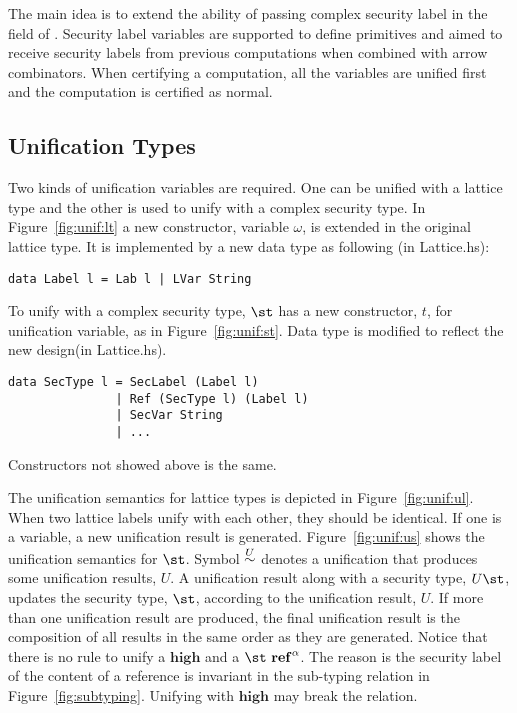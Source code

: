The main idea is to extend the ability of passing complex security label in the  field 
of . Security label variables are supported to define primitives and aimed to
receive security labels from previous computations when combined with arrow combinators.
When certifying a computation, all the variables are unified first and the computation is 
certified as normal.

\subsection{Unification Types}
Two kinds of unification variables are required. One can be unified with a lattice type and the other
is used to  unify with a complex security type. In Figure~\ref{fig:unif:lt} a new constructor, variable $\omega$,
is extended in the original lattice type. It is implemented by a new data type  as following
(in Lattice.hs):
\begin{verbatim}
data Label l = Lab l | LVar String
\end{verbatim}
To unify with a complex security type, $\st$ has a new constructor, $t$, for unification variable, as in 
Figure~\ref{fig:unif:st}. Data type  is modified to reflect the new design(in Lattice.hs).
\begin{verbatim}
data SecType l = SecLabel (Label l) 
               | Ref (SecType l) (Label l)
               | SecVar String
               | ...
\end{verbatim}
Constructors not showed above is the same.

The unification semantics for lattice types is depicted in Figure~\ref{fig:unif:ul}. When two lattice labels
unify with each other, they should be identical. If one is a variable, a new unification
result is generated. Figure~\ref{fig:unif:us} shows the unification semantics for $\st$. 
Symbol $\stackrel{{U}}{\sim}$ denotes a unification that produces some unification results, $U$. A unification
result along with a security type, $U\st$, updates the security type, $\st$, according to the unification
result, $U$. If more than one unification result are produced, the final unification result is the 
composition of all results in the same order as they are generated. Notice that there is no rule to
unify a $\mathbf{high}$ and a $\st~\mathbf{ref}^\alpha$. The reason is the security label of the content
of a reference is invariant in the sub-typing relation in Figure~\ref{fig:subtyping}. Unifying with
$\mathbf{high}$ may break the relation.

